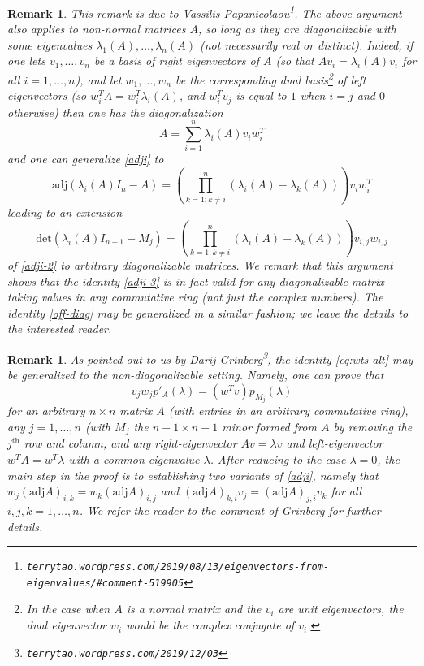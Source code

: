 \documentclass{amsart}
\newtheorem{remark}[lemma]{Remark}
\begin{document}
\begin{remark} This remark is due to Vassilis Papanicolaou\footnote{\tt terrytao.wordpress.com/2019/08/13/eigenvectors-from-eigenvalues/\#comment-519905}.  The above argument also applies to non-normal matrices $A$, so long as they are diagonalizable with some eigenvalues $\lambda_1(A),\dots,\lambda_n(A)$ (not necessarily real or distinct).  Indeed, if one lets $v_1,\dots,v_n$ be a basis of right eigenvectors of $A$ (so that $A v_i = \lambda_i(A) v_i$ for all $i=1,\dots,n$), and let $w_1,\dots,w_n$ be the corresponding dual basis\footnote{In the case when $A$ is a normal matrix and the $v_i$ are unit eigenvectors, the dual eigenvector $w_i$ would be the complex conjugate of $v_i$.} of left eigenvectors (so $w_i^T A = w_i^T \lambda_i(A)$, and $w_i^T v_j$ is equal to $1$ when $i=j$ and $0$ otherwise) then one has the diagonalization
$$ A = \sum_{i=1}^n \lambda_i(A) v_i w_i^T$$
and one can generalize \eqref{adji} to
\begin{equation}\label{lia}
 \mathrm{adj}(\lambda_i(A) I_n - A) = (\prod_{k=1; k \neq i}^n (\lambda_i(A) - \lambda_k(A)) ) v_i w_i^T
\end{equation}
leading to an extension
\begin{equation}\label{adji-3}
 \mathrm{det}(\lambda_i(A) I_{n-1} - M_j) = (\prod_{k=1; k \neq i}^n (\lambda_i(A) - \lambda_k(A)) ) v_{i,j} w_{i,j}
\end{equation}
of \eqref{adji-2} to arbitrary diagonalizable matrices.  We remark that this argument shows that the identity \eqref{adji-3} is in fact valid for any diagonalizable matrix taking values in any commutative ring (not just the complex numbers).  The identity \eqref{off-diag} may be generalized in a similar fashion; we leave the details to the interested reader.  
\end{remark}

\begin{remark}\label{grin} As pointed out to us by Darij Grinberg\footnote{{\tt terrytao.wordpress.com/2019/12/03}}, the identity \eqref{eq:wts-alt} may be generalized to the non-diagonalizable setting.  Namely, one can prove that
$$ v_j w_j p'_A(\lambda) = (w^T v) p_{M_j}(\lambda)$$
for an arbitrary $n \times n$ matrix $A$ (with entries in an arbitrary commutative ring), any $j=1,\dots,n$ (with $M_j$ the $n-1 \times n-1$ minor formed from $A$ by removing the $j^{\mathrm{th}}$ row and column, and any right-eigenvector $Av = \lambda v$ and left-eigenvector $w^T A = w^T \lambda$ with a common eigenvalue $\lambda$.  After reducing to the case $\lambda=0$, the main step in the proof is to establishing two variants of \eqref{adji}, namely that $w_j (\mathrm{adj} A)_{i,k} = w_k (\mathrm{adj} A)_{i,j}$ and $(\mathrm{adj} A)_{k,i} v_j = (\mathrm{adj} A)_{j,i} v_k$ for all $i,j,k=1,\dots,n$. We refer the reader to the comment of Grinberg for further details.
\end{remark}
\end{document}
